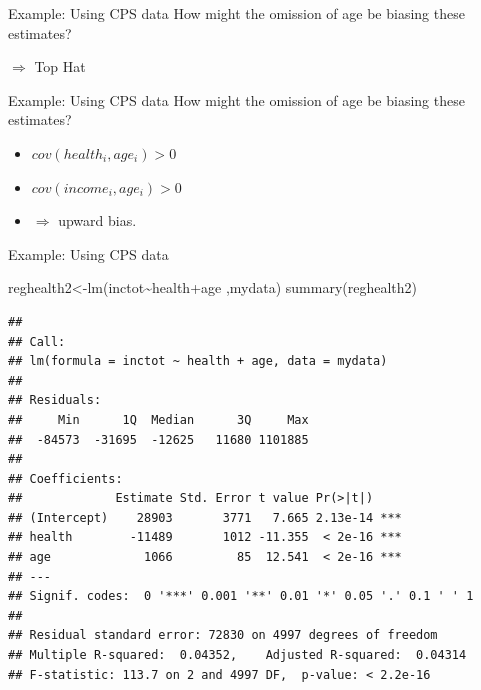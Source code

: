 \documentclass[
  ignorenonframetext,
]{beamer}
\newenvironment{Shaded}{\begin{snugshade}}{\end{snugshade}}
\newcommand{\FunctionTok}[1]{\textcolor[rgb]{0.00,0.00,0.00}{#1}}
\newcommand{\NormalTok}[1]{#1}
\newcommand{\OtherTok}[1]{\textcolor[rgb]{0.56,0.35,0.01}{#1}}
\newcommand{\SpecialCharTok}[1]{\textcolor[rgb]{0.00,0.00,0.00}{#1}}
\begin{document}
\begin{frame}{Example: Using CPS data}
\protect\hypertarget{example-using-cps-data-2}{}
How might the omission of age be biasing these estimates?

\(\Rightarrow\) Top Hat
\end{frame}

\begin{frame}{Example: Using CPS data}
\protect\hypertarget{example-using-cps-data-3}{}
How might the omission of age be biasing these estimates?

\begin{itemize}
\item
  \(cov(health_i,age_i)>0\)
\item
  \(cov(income_i,age_i)>0\)
\item
  \(\Rightarrow\) upward bias.
\end{itemize}
\end{frame}

\begin{frame}[fragile]{Example: Using CPS data}
\protect\hypertarget{example-using-cps-data-4}{}
\tiny

\begin{Shaded}
\begin{Highlighting}[]
\NormalTok{reghealth2}\OtherTok{\textless{}{-}}\FunctionTok{lm}\NormalTok{(inctot}\SpecialCharTok{\textasciitilde{}}\NormalTok{health}\SpecialCharTok{+}\NormalTok{age ,mydata)}
\FunctionTok{summary}\NormalTok{(reghealth2)}
\end{Highlighting}
\end{Shaded}

\begin{verbatim}
## 
## Call:
## lm(formula = inctot ~ health + age, data = mydata)
## 
## Residuals:
##     Min      1Q  Median      3Q     Max 
##  -84573  -31695  -12625   11680 1101885 
## 
## Coefficients:
##             Estimate Std. Error t value Pr(>|t|)    
## (Intercept)    28903       3771   7.665 2.13e-14 ***
## health        -11489       1012 -11.355  < 2e-16 ***
## age             1066         85  12.541  < 2e-16 ***
## ---
## Signif. codes:  0 '***' 0.001 '**' 0.01 '*' 0.05 '.' 0.1 ' ' 1
## 
## Residual standard error: 72830 on 4997 degrees of freedom
## Multiple R-squared:  0.04352,    Adjusted R-squared:  0.04314 
## F-statistic: 113.7 on 2 and 4997 DF,  p-value: < 2.2e-16
\end{verbatim}

\normalsize
\end{frame}
\end{document}
